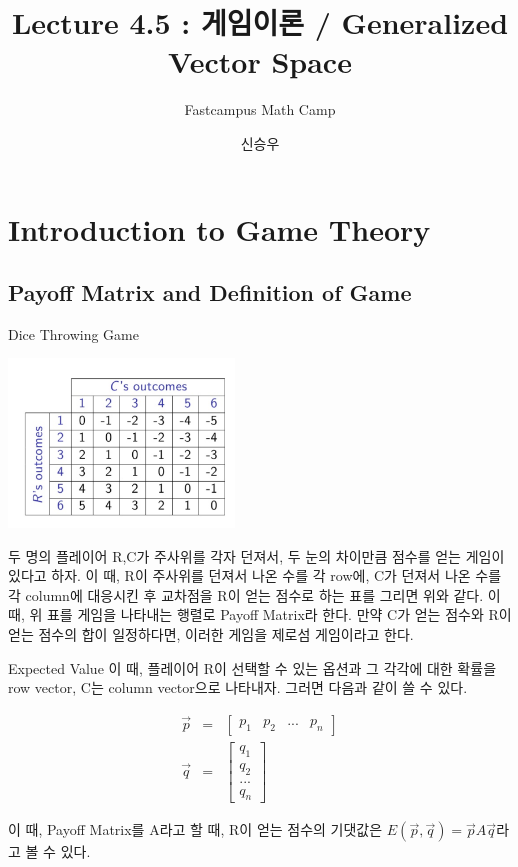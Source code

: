 \documentclass{beamer}
\title{Lecture 4.5 : 게임이론 / Generalized Vector Space}
\subtitle{Fastcampus Math Camp}
\author{신승우}
\begin{document}
\begin{frame}
 \titlepage
\end{frame}




\section{Introduction to Game Theory} 



\subsection{Payoff Matrix and Definition of Game} 

\begin{frame}{Dice Throwing Game}

\includegraphics[width=6cm,keepaspectratio]{dice}


두 명의 플레이어 R,C가 주사위를 각자 던져서, 두 눈의 차이만큼 점수를 얻는 게임이 있다고 하자. 이 때, R이 주사위를 던져서 나온 수를 각 row에, C가 던져서 나온 수를 각 column에 대응시킨 후 교차점을 R이 얻는 점수로 하는 표를 그리면 위와 같다.  이 때, 위 표를 게임을 나타내는 행렬로 Payoff Matrix라 한다. 만약 C가 얻는 점수와 R이 얻는 점수의 합이 일정하다면, 이러한 게임을 제로섬 게임이라고 한다. 

\end{frame} 


\begin{frame}{Expected Value}
이 때, 플레이어 R이 선택할 수 있는 옵션과 그 각각에 대한 확률을 row vector, C는 column vector으로 나타내자. 그러면 다음과 같이 쓸 수 있다. 

\begin{eqnarray} 
\vec{p}& = &\left[ \begin{matrix} p_1 & p_2 & ... & p_n \end{matrix} \right] \\
\vec{q}& = &\left[ \begin{matrix} q_1 \\ q_2 \\ ... \\ q_n \end{matrix} \right]
\end{eqnarray}
 
이 때, Payoff Matrix를 A라고 할 때, R이 얻는 점수의 기댓값은 $E(\vec{p}, \vec{q}) = \vec{p}A\vec{q}$라고 볼 수 있다. 
\end{frame} 
\end{document}
